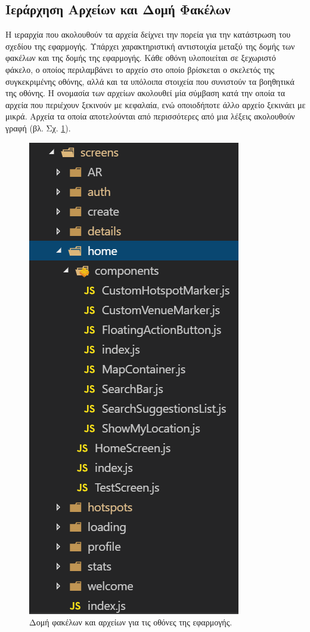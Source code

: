 \subsection{Ιεράρχηση Αρχείων και Δομή Φακέλων}
Η ιεραρχία που ακολουθούν τα αρχεία δείχνει την πορεία για την κατάστρωση του σχεδίου της εφαρμογής. Υπάρχει χαρακτηριστική αντιστοιχία μεταξύ της δομής των φακέλων και της δομής της εφαρμογής. Κάθε οθόνη υλοποιείται σε ξεχωριστό φάκελο, ο οποίος περιλαμβάνει το αρχείο στο οποίο βρίσκεται ο σκελετός της συγκεκριμένης οθόνης, αλλά και τα υπόλοιπα στοιχεία που συνιστούν τα βοηθητικά  της οθόνης. Η ονομασία των αρχείων ακολουθεί μία σύμβαση κατά την οποία τα αρχεία που περιέχουν  ξεκινούν με κεφαλαία, ενώ οποιοδήποτε άλλο αρχείο ξεκινάει με μικρά. Αρχεία τα οποία αποτελούνται από περισσότερες από μια λέξεις ακολουθούν  γραφή (βλ. Σχ. \ref{screens}).

\begin{figure}[H]
    \centering
    \includegraphics[scale=0.7]{figures/screens.png}
    \caption{Δομή φακέλων και αρχείων για τις οθόνες της εφαρμογής.}
    \label{screens}
\end{figure}

